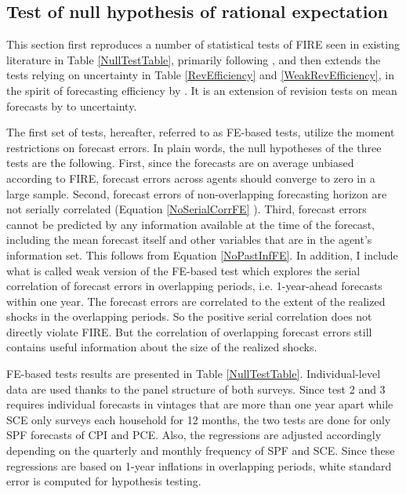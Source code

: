 \documentclass[12pt]{article}
\begin{document}
	
	\subsection{Test of null hypothesis of rational expectation}\label{NullTest}
	
	This section first reproduces a number of statistical tests of FIRE seen in existing literature in Table \ref{NullTestTable}, primarily following \citet{mankiw2003disagreement},  and then extends the tests relying on uncertainty in Table \ref{RevEfficiency} and \ref{WeakRevEfficiency}, in the spirit of forecasting efficiency by \citet{nordhaus1987forecasting}. It is an extension of revision tests on mean forecasts by \citet{fuhrer2018intrinsic} to uncertainty.  
	
	The first set of tests, hereafter, referred to as FE-based tests, utilize the moment restrictions on forecast errors. In plain words, the null hypotheses of the three tests are the following. First, since the forecasts are on average unbiased according to FIRE, forecast errors across agents should converge to zero in a large sample. Second, forecast errors of non-overlapping forecasting horizon are not serially correlated (Equation \ref{NoSerialCorrFE} ).  Third, forecast errors cannot be predicted by any information available at the time of the forecast, including the mean forecast itself and other variables that are in the agent's information set. This follows from Equation \ref{NoPastInfFE}. In addition, I include what is called weak version of the FE-based test which explores the serial correlation of forecast errors in overlapping periods,  i.e. 1-year-ahead forecasts within one year. The forecast errors are correlated to the extent of the realized shocks in the overlapping periods. So the positive serial correlation does not directly violate FIRE. But the correlation of overlapping forecast errors still contains useful information about the size of the realized shocks. 
	
	FE-based tests results are presented in Table \ref{NullTestTable}. Individual-level data are used thanks to the panel structure of both surveys. Since test 2 and 3 requires individual forecasts in vintages that are more than one year apart while SCE only surveys each household for 12 months, the two tests are done for only SPF forecasts of CPI and PCE. Also, the regressions are adjusted accordingly depending on the quarterly and monthly frequency of SPF and SCE. Since these regressions are based on 1-year inflations in overlapping periods, white standard error is computed for hypothesis testing. 
	
\end{document}
